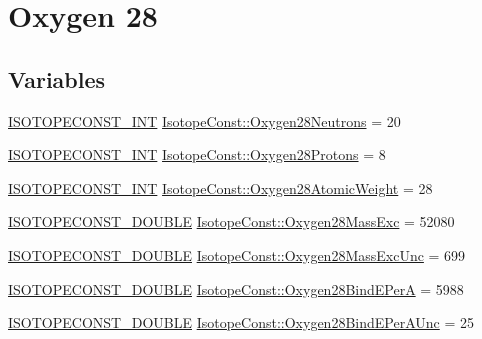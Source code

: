 \hypertarget{group___isotope_const-_oxygen-_o28}{}\section{Oxygen 28}
\label{group___isotope_const-_oxygen-_o28}
\subsection*{Variables}
\begin{DoxyCompactItemize}
\item 
\mbox{\hyperlink{group___isotope_const-_macros_ga5f18360b3e99483a35c32d789e62621c}{I\+S\+O\+T\+O\+P\+E\+C\+O\+N\+S\+T\+\_\+\+I\+NT}} \mbox{\hyperlink{group___isotope_const-_oxygen-_o28_ga0e9e0a9d63e3ee5214d5bc21e894fd0d}{Isotope\+Const\+::\+Oxygen28\+Neutrons}} = 20
\item 
\mbox{\hyperlink{group___isotope_const-_macros_ga5f18360b3e99483a35c32d789e62621c}{I\+S\+O\+T\+O\+P\+E\+C\+O\+N\+S\+T\+\_\+\+I\+NT}} \mbox{\hyperlink{group___isotope_const-_oxygen-_o28_ga0a03582cb97595a742db183ce473b5b0}{Isotope\+Const\+::\+Oxygen28\+Protons}} = 8
\item 
\mbox{\hyperlink{group___isotope_const-_macros_ga5f18360b3e99483a35c32d789e62621c}{I\+S\+O\+T\+O\+P\+E\+C\+O\+N\+S\+T\+\_\+\+I\+NT}} \mbox{\hyperlink{group___isotope_const-_oxygen-_o28_ga3c0b3c956ebaad478eb6d6a5b073a5b1}{Isotope\+Const\+::\+Oxygen28\+Atomic\+Weight}} = 28
\item 
\mbox{\hyperlink{group___isotope_const-_macros_ga8f45a7272ce02c0b4c65c44636ed719a}{I\+S\+O\+T\+O\+P\+E\+C\+O\+N\+S\+T\+\_\+\+D\+O\+U\+B\+LE}} \mbox{\hyperlink{group___isotope_const-_oxygen-_o28_gae33a3721428f6e98ef31afcb29285e3a}{Isotope\+Const\+::\+Oxygen28\+Mass\+Exc}} = 52080
\item 
\mbox{\hyperlink{group___isotope_const-_macros_ga8f45a7272ce02c0b4c65c44636ed719a}{I\+S\+O\+T\+O\+P\+E\+C\+O\+N\+S\+T\+\_\+\+D\+O\+U\+B\+LE}} \mbox{\hyperlink{group___isotope_const-_oxygen-_o28_ga528373441ee736973b78b7750d2f9333}{Isotope\+Const\+::\+Oxygen28\+Mass\+Exc\+Unc}} = 699
\item 
\mbox{\hyperlink{group___isotope_const-_macros_ga8f45a7272ce02c0b4c65c44636ed719a}{I\+S\+O\+T\+O\+P\+E\+C\+O\+N\+S\+T\+\_\+\+D\+O\+U\+B\+LE}} \mbox{\hyperlink{group___isotope_const-_oxygen-_o28_ga4a5f8151ae0ea653f82efceddf4ba0ac}{Isotope\+Const\+::\+Oxygen28\+Bind\+E\+PerA}} = 5988
\item 
\mbox{\hyperlink{group___isotope_const-_macros_ga8f45a7272ce02c0b4c65c44636ed719a}{I\+S\+O\+T\+O\+P\+E\+C\+O\+N\+S\+T\+\_\+\+D\+O\+U\+B\+LE}} \mbox{\hyperlink{group___isotope_const-_oxygen-_o28_gabc28a75f7285406b055fa9b4b297dd1b}{Isotope\+Const\+::\+Oxygen28\+Bind\+E\+Per\+A\+Unc}} = 25

\end{DoxyCompactItemize}
